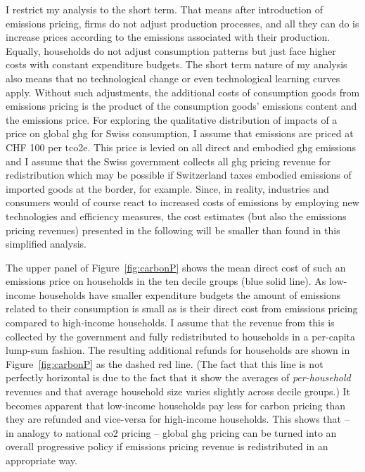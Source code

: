 \documentclass[referee, lineno, pdflatex,sn-apa]{sn-jnl}%
\theoremstyle{thmstyleone}%
\theoremstyle{thmstyletwo}%
\theoremstyle{thmstylethree}%
\begin{document}
I restrict my analysis to the short term.
That means after introduction of emissions pricing, firms do not adjust production processes, and all they can do is increase prices according to the emissions associated with their production.
Equally, households do not adjust consumption patterns but just face higher costs with constant expenditure budgets.
The short term nature of my analysis also means that no technological change or even technological learning curves apply.
Without such adjustments, the additional costs of consumption goods from emissions pricing is the product of the consumption goods' emissions content and the emissions price.
For exploring the qualitative distribution of impacts of a price on global \ac{ghg} for Swiss consumption, I assume that emissions are priced at CHF 100 per t\ac{co2e}.
This price is levied on all direct and embodied \ac{ghg} emissions and I assume that the Swiss government collects all \ac{ghg} pricing revenue for redistribution which may be possible if Switzerland taxes embodied emissions of imported goods at the border, for example.
Since, in reality, industries and consumers would of course react to increased costs of emissions by employing new technologies and efficiency measures, the cost estimates (but also the emissions pricing revenues) presented in the following will be smaller than found in this simplified analysis.

The upper panel of Figure~\ref{fig:carbonP} shows the mean direct cost of such an emissions price on households in the ten decile groups (blue solid line).
As low-income households have smaller expenditure budgets the amount of emissions related to their consumption is small as is their direct cost from emissions pricing compared to high-income households.
I assume that the revenue from this is collected by the government and fully redistributed to households in a per-capita lump-sum fashion.
The resulting additional refunds for households are shown in Figure~\ref{fig:carbonP} as the dashed red line.
(The fact that this line is not perfectly horizontal is due to the fact that it show the averages of \emph{per-household} revenues and that average household size varies slightly across decile groups.)
It becomes apparent that low-income households pay less for carbon pricing than they are refunded and vice-versa for high-income households.
This shows that -- in analogy to national \ac{co2} pricing -- global \ac{ghg} pricing can be turned into an overall progressive policy if emissions pricing revenue is redistributed in an appropriate way.
\end{document}
